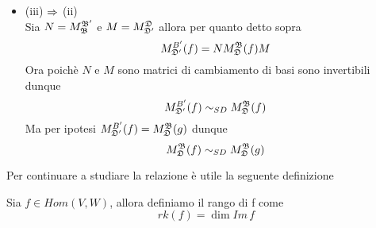 \begin{prop}
\begin{itemize}
$$\begin{tikzcd}
\end{tikzcd}$$
dove $\AB(g)=MAN $\\
Ora poich\`e $M$ e $N$ sono invertibili li posso interpretare come matrice di cambiamento di base quindi
$$ \exists \B' \text{ base di } V \tc M^{\B'}_\B (id_V) = N $$
$$ \exists \D' \text{ base di } W \tc M_{\D'}^\D(id_W) = M $$
otteniamo dunque
$$ \begin{tikzcd} 
V \arrow{r}{id_V} \arrow{d}{[\,]_{\B'} } &V \arrow[r,"f"] \arrow{d}{[\,]_\B} & W \arrow{r}{id_W} \arrow{d}{[\,]_\D }&W \arrow{d}{[\,]_{\D'} }\\ \K^n \arrow[r,"N"] & \K^n \arrow[r,"A"] &\K^m \arrow[r,"M"]&\K^m
\end{tikzcd}$$
Dunque 
$$ M^{\B'}_{\D'} (f) = M^{\B'}_{\D'} (id_W\circ f \circ id_V) =M A N =\AB(g)$$
\item (iii) $\Rightarrow$ (ii)\\
Sia $ N = M^{\mathfrak{B}'}_{\mathfrak{B}} $ e $M =M^{\mathfrak{D}}_{\mathfrak{D}'}$ allora  per quanto detto sopra
$$ M^{B'}_{\mathfrak{D}'}(f)= N M_{\mathfrak{D}} ^{\mathfrak{B}} (f) M $$
Ora poich\`e $N$ e $M$ sono matrici di cambiamento di basi sono invertibili dunque
$$  M^{B'}_{\mathfrak{D}'}(f) \sim_{SD} M_{\mathfrak{D}} ^{\mathfrak{B}} (f)$$
Ma per ipotesi $ M^{B'}_{\mathfrak{D}'}(f)=M_{\mathfrak{D}} ^{\mathfrak{B}} (g)$ dunque
$$ M_{\mathfrak{D}} ^{\mathfrak{B}} (f) \sim_{SD} M_{\mathfrak{D}} ^{\mathfrak{B}}(g)$$
\end{itemize}
\endproof
\end{prop}
\newpage
Per continuare a studiare la relazione \`e utile la seguente definizione
\begin{defn}[Rango]\bianco
Sia $f \in Hom (V,W)$, allora definiamo il rango di f come 
$$rk( f) = \dim Im \, f $$
\end{defn}

\spazio

